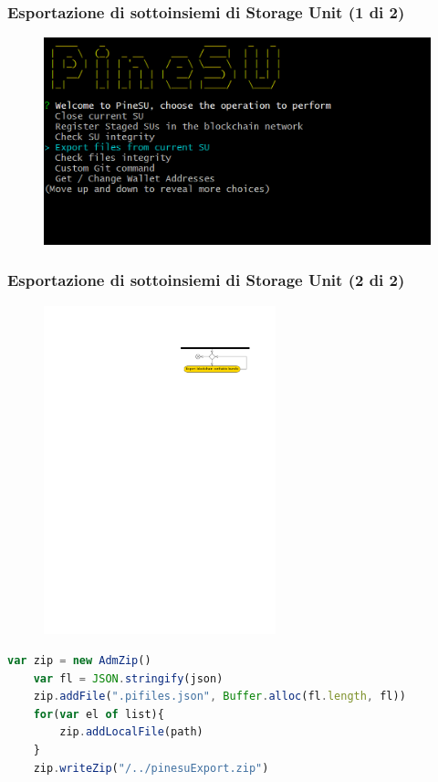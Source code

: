 \documentclass{beamer}
\begin{document}
\begin{frame}
	\frametitle{Esportazione di sottoinsiemi di Storage Unit (1 di 2)}
	\begin{figure}
		\includegraphics[width=\textwidth]{figures/ops/6.png}
	\end{figure}
\end{frame}

\begin{frame}[fragile]
	\frametitle{Esportazione di sottoinsiemi di Storage Unit (2 di 2)}
	\begin{figure}
		\includegraphics[width=0.6\textwidth]{figures/export.pdf}
	\end{figure}
	\begin{lstlisting}[language=JavaScript, numbers=none]
	var zip = new AdmZip()
	var fl = JSON.stringify(json)
	zip.addFile(".pifiles.json", Buffer.alloc(fl.length, fl))
	for(var el of list){
		zip.addLocalFile(path)
	}
	zip.writeZip("/../pinesuExport.zip")
	\end{lstlisting}
\end{frame}
\end{document}
